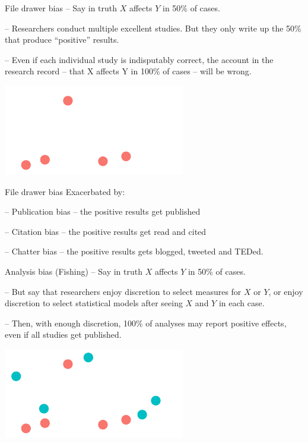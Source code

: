 \documentclass[
  11pt,
  ignorenonframetext,
]{beamer}
\begin{document}
\begin{frame}{File drawer bias}
\protect\hypertarget{file-drawer-bias-1}{}
-- Say in truth \(X\) affects \(Y\) in 50\% of cases.

-- Researchers conduct multiple excellent studies. But they only write
up the 50\% that produce ``positive'' results.

-- Even if each individual study is indisputably correct, the account in
the research record -- that X affects Y in 100\% of cases -- will be
wrong.

\includegraphics{5.2_process_files/figure-beamer/unnamed-chunk-3-1.pdf}
\end{frame}

\begin{frame}{File drawer bias}
\protect\hypertarget{file-drawer-bias-2}{}
Exacerbated by:

-- Publication bias -- the positive results get published

-- Citation bias -- the positive results get read and cited

-- Chatter bias -- the positive results gets blogged, tweeted and TEDed.
\end{frame}

\begin{frame}{Analysis bias (Fishing)}
\protect\hypertarget{analysis-bias-fishing}{}
-- Say in truth \(X\) affects \(Y\) in 50\% of cases.

-- But say that researchers enjoy discretion to select measures for
\(X\) or \(Y\), or enjoy discretion to select statistical models after
seeing \(X\) and \(Y\) in each case.

-- Then, with enough discretion, 100\% of analyses may report positive
effects, even if all studies get published.

\includegraphics{5.2_process_files/figure-beamer/unnamed-chunk-4-1.pdf}
\end{frame}
\end{document}
